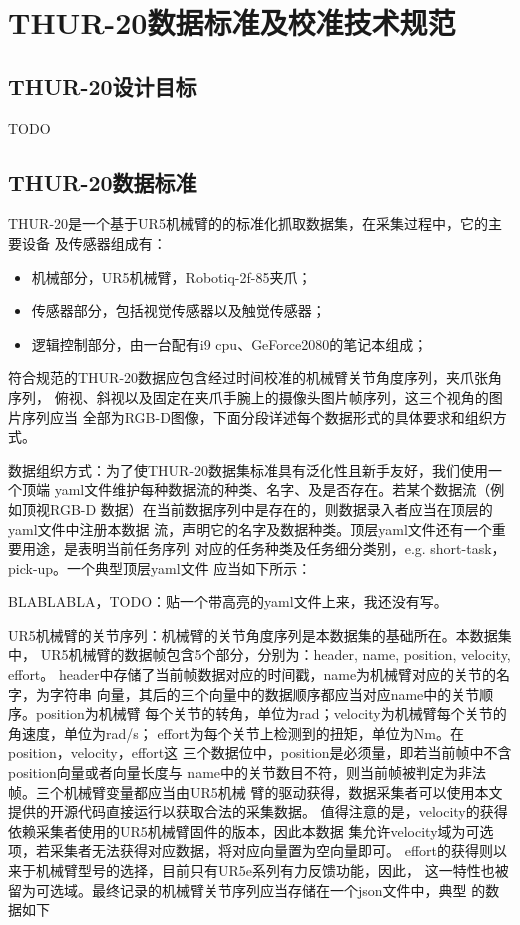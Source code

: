 
\chapter{THUR-20数据标准及校准技术规范}
\label{cha:chapter02}

\section{THUR-20设计目标}
\label{sec:design}
TODO

\section{THUR-20数据标准}
\label{sec:standard}

  THUR-20是一个基于UR5机械臂的的标准化抓取数据集，在采集过程中，它的主要设备
  及传感器组成有：

  \begin{itemize}
    \item 机械部分，UR5机械臂，Robotiq-2f-85夹爪；
    \item 传感器部分，包括视觉传感器以及触觉传感器；
    \item 逻辑控制部分，由一台配有i9 cpu、GeForce2080的笔记本组成；
  \end{itemize}

  符合规范的THUR-20数据应包含经过时间校准的机械臂关节角度序列，夹爪张角序列，
  俯视、斜视以及固定在夹爪手腕上的摄像头图片帧序列，这三个视角的图片序列应当
  全部为RGB-D图像，下面分段详述每个数据形式的具体要求和组织方式。

  数据组织方式：为了使THUR-20数据集标准具有泛化性且新手友好，我们使用一个顶端
  yaml文件维护每种数据流的种类、名字、及是否存在。若某个数据流（例如顶视RGB-D
  数据）在当前数据序列中是存在的，则数据录入者应当在顶层的yaml文件中注册本数据
  流，声明它的名字及数据种类。顶层yaml文件还有一个重要用途，是表明当前任务序列
  对应的任务种类及任务细分类别，e.g. short-task，pick-up。一个典型顶层yaml文件
  应当如下所示：

  BLABLABLA，TODO：贴一个带高亮的yaml文件上来，我还没有写。

  UR5机械臂的关节序列：机械臂的关节角度序列是本数据集的基础所在。本数据集中，
  UR5机械臂的数据帧包含5个部分，分别为：header, name, position, velocity, effort。
  header中存储了当前帧数据对应的时间戳，name为机械臂对应的关节的名字，为字符串
  向量，其后的三个向量中的数据顺序都应当对应name中的关节顺序。position为机械臂
  每个关节的转角，单位为rad；velocity为机械臂每个关节的角速度，单位为rad/s；
  effort为每个关节上检测到的扭矩，单位为Nm。在position，velocity，effort这
  三个数据位中，position是必须量，即若当前帧中不含position向量或者向量长度与
  name中的关节数目不符，则当前帧被判定为非法帧。三个机械臂变量都应当由UR5机械
  臂的驱动获得，数据采集者可以使用本文提供的开源代码直接运行以获取合法的采集数据。
  值得注意的是，velocity的获得依赖采集者使用的UR5机械臂固件的版本，因此本数据
  集允许velocity域为可选项，若采集者无法获得对应数据，将对应向量置为空向量即可。
  effort的获得则以来于机械臂型号的选择，目前只有UR5e系列有力反馈功能，因此，
  这一特性也被留为可选域。最终记录的机械臂关节序列应当存储在一个json文件中，典型
  的数据如下

